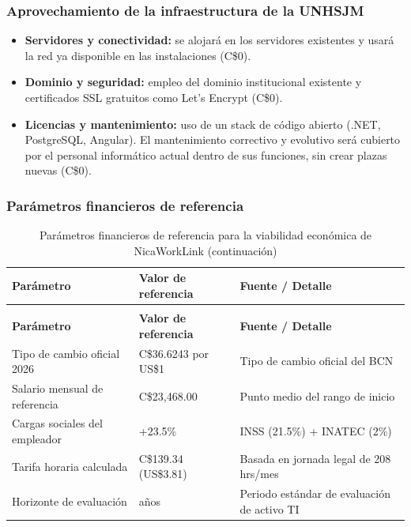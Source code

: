 \subsubsection{Aprovechamiento de la infraestructura de la UNHSJM}

\begin{itemize}
	\item \textbf{Servidores y conectividad:} se alojará en los servidores existentes y usará la red ya disponible en las instalaciones (C\$0).
	\item \textbf{Dominio y seguridad:} empleo del dominio institucional existente y certificados SSL gratuitos como Let's Encrypt (C\$0).
	\item \textbf{Licencias y mantenimiento:} uso de un stack de código abierto (.NET, PostgreSQL, Angular). El mantenimiento correctivo y evolutivo será cubierto por el personal informático actual dentro de sus funciones, sin crear plazas nuevas (C\$0).
\end{itemize}
\clearpage

\subsubsection{Parámetros financieros de referencia}

\begin{longtable}{@{}>{\raggedright\arraybackslash}p{4.5cm}>{\raggedright\arraybackslash}p{4cm}>{\raggedright\arraybackslash}p{5.5cm}@{}}
\caption{Parámetros financieros de referencia para la viabilidad económica de NicaWorkLink}\label{tab:parametros-financieros}\\
\hline
\textbf{Parámetro} & \textbf{Valor de referencia} & \textbf{Fuente / Detalle} \\
\hline
\endfirsthead
\caption[]{Parámetros financieros de referencia para la viabilidad económica de NicaWorkLink (continuación)}\\
\hline
\textbf{Parámetro} & \textbf{Valor de referencia} & \textbf{Fuente / Detalle} \\
\hline
\endhead
\hline
\endlastfoot
Tipo de cambio oficial 2026 & C\$36.6243 por US\$1 & Tipo de cambio oficial del BCN \parencite{bcn2025} \\
\hline
Salario mensual de referencia & C\$23,468.00 & Punto medio del rango de inicio \parencite{wageindicator2026} \\
\hline
Cargas sociales del empleador & +23.5\% & INSS (21.5\%) + INATEC (2\%) \parencite{inss} \\
\hline
Tarifa horaria calculada & C\$139.34 (US\$3.81) & Basada en jornada legal de 208 hrs/mes \\
\hline
Horizonte de evaluación & 5 años & Periodo estándar de evaluación de activo TI \\
\end{longtable}

